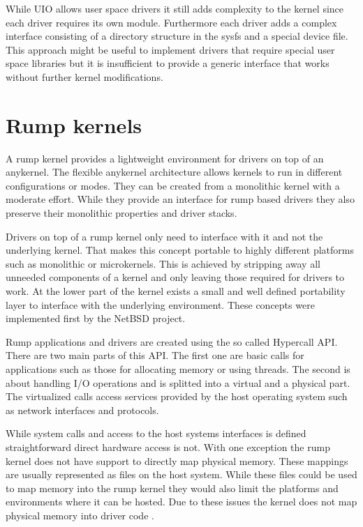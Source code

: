 \documentclass[
a4paper,
12pt,
notitlepage,
parskip=half,
DIV=11,
]{scrbook}
\begin{document}
		While UIO allows user space drivers it still adds complexity to the kernel since each driver requires its own module.
		Furthermore each driver adds a complex interface consisting of a directory structure in the sysfs and a special device file.
		This approach might be useful to implement drivers that require special user space libraries but it is insufficient to provide a generic interface that works without further kernel modifications.
		
		\section{Rump kernels}
		
		A rump kernel provides a lightweight environment for drivers on top of an anykernel.
		The flexible anykernel architecture allows kernels to run in different configurations or modes.
		They can be created from a monolithic kernel with a moderate effort.
		While they provide an interface for rump based drivers they also preserve their monolithic properties and driver stacks. \citep{kantee}
		
		Drivers on top of a rump kernel only need to interface with it and not the underlying kernel.
		That makes this concept portable to highly different platforms such as monolithic or microkernels.
		This is achieved by stripping away all unneeded components of a kernel and only leaving those required for drivers to work.
		At the lower part of the kernel exists a small and well defined portability layer to interface with the underlying environment.
		These concepts were implemented first by the NetBSD project. \citep{bsd_rump}\citep{fosdem_rump}\citep{rump}
		
		Rump applications and drivers are created using the so called Hypercall API.
		There are two main parts of this API.
		The first one are basic calls for applications such as those for allocating memory or using threads.
		The second is about handling I/O operations and is splitted into a virtual and a physical part.
		The virtualized calls access services provided by the host operating system such as network interfaces and protocols. \citep{rump_man} \citep{rump_platform}
		
		While system calls and access to the host systems interfaces is defined straightforward direct hardware access is not.
		With one exception the rump kernel does not have support to directly map physical memory.
		These mappings are usually represented as files on the host system.
		While these files could be used to map memory into the rump kernel they would also limit the platforms and environments where it can be hosted.
		Due to these issues the kernel does not map physical memory into driver code \citep{kantee}.
		
\end{document}
